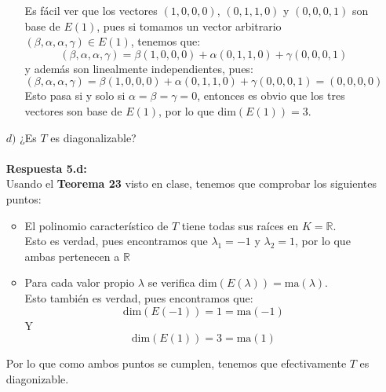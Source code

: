 \begin{itemize}
\begin{itemize}
Es f\'acil ver que los vectores $(1,0,0,0)$, $(0,1,1,0)$ y $(0,0,0,1)$ son base de $E(1)$, pues si tomamos un vector arbitrario $(\beta,\alpha,\alpha,\gamma)\in E(1)$, tenemos que:
\[(\beta,\alpha,\alpha,\gamma)=\beta(1,0,0,0)+\alpha(0,1,1,0)+\gamma(0,0,0,1)\]
y adem\'as son linealmente independientes, pues:
\[(\beta,\alpha,\alpha,\gamma)=\beta(1,0,0,0)+\alpha(0,1,1,0)+\gamma(0,0,0,1)=(0,0,0,0)\]
Esto pasa si y solo si $\alpha=\beta=\gamma=0$, entonces es obvio que los tres vectores son base de $E(1)$, por lo que $\text{dim}(E(1))=3$.
\end{itemize}
    
    \item [$d)$] ¿Es $T$ es diagonalizable?\\\\
    \textbf{Respuesta 5.d:}\\
    Usando el \textbf{Teorema 23} visto en clase, tenemos que comprobar los siguientes puntos:
    \begin{itemize}
        \item El polinomio característico de $T$ tiene todas sus raíces en $K=\mathbb{R}$.\\
        Esto es verdad, pues encontramos que $\lambda_1=-1$ y $\lambda_2=1$, por lo que ambas pertenecen a $\mathbb{R}$
\item Para cada valor propio $\lambda$ se verifica $\text{dim}(E(\lambda))=\text{ma}(\lambda)$.\\
Esto tambi\'en es verdad, pues encontramos que:
\[\text{dim}(E(-1))=1=\text{ma}(-1)\]Y\[\text{dim}(E(1))=3=\text{ma}(1)\]

    \end{itemize}
    Por lo que como ambos puntos se cumplen, tenemos que efectivamente $T$ es diagonizable.
    
\end{itemize}